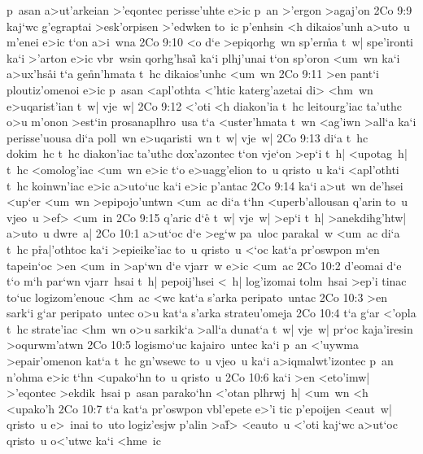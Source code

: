 p~asan
a>ut'arkeian
>'eqontec
perisse'uhte
e>ic
p~an
>'ergon
>agaj'on\bibvsend
\vs 2Co 9:9
kaj`wc
g'egraptai
>esk'orpisen
>'edwken
to~ic
p'enhsin
<h
dikaios'unh
a>uto~u
m'enei
e>ic
t`on
a>i~wna\bibvsend
\vs 2Co 9:10
<o
d`e
>epiqorhg~wn
sp'er\r{m}a
t~w|
spe'ironti
ka`i
>'arton
e>ic
vbr~wsin
qorhg'hsai\r{}
ka`i
plhj'unai
t`on
sp'oron
<um~wn
ka`i
a>ux'hs\r{a}i
t`a
ge\r{n}n'hmata
t~hc
dikaios'unhc
<um~wn\bibvsend
\vs 2Co 9:11
>en
pant`i
ploutiz'omenoi
e>ic
p~asan
<apl'othta
<'htic
katerg'azetai
di>
<hm~wn
e>uqarist'ian
t~w|
vje~w|\bibvsend
\vs 2Co 9:12
<'oti
<h
diakon'ia
t~hc
leitourg'iac
ta'uthc
o>u
m'onon
>est`in
prosanaplhro~usa
t`a
<uster'hmata
t~wn
<ag'iwn
>all`a
ka`i
perisse'uousa
di`a
poll~wn
e>uqaristi~wn
t~w|
vje~w|\bibvsend
\vs 2Co 9:13
di`a
t~hc
dokim~hc
t~hc
diakon'iac
ta'uthc
dox'azontec
t`on
vje`on
>ep`i
t~h|
<upotag~h|
t~hc
<omolog'iac
<um~wn
e>ic
t`o
e>uagg'elion
to~u
qristo~u
ka`i
<apl'othti
t~hc
koinwn'iac
e>ic
a>uto`uc
ka`i
e>ic
p'antac\bibvsend
\vs 2Co 9:14
ka`i
a>ut~wn
de'hsei
<up`er
<um~wn
>epipojo'untwn
<um~ac
di`a
t`hn
<uperb'allousan
q'arin
to~u
vjeo~u
>ef>
<um~in\bibvsend
\vs 2Co 9:15
q'aric
d`e\r{}
t~w|
vje~w|
>ep`i
t~h|
>anekdihg'htw|
a>uto~u
dwre~a|\bibvsend
\vs 2Co 10:1
a>ut`oc
d`e
>eg`w
pa~uloc
parakal~w
<um~ac
di`a
t~hc
p\r{r}a|\-'oth\-toc
ka`i
>epieike'iac
to~u
qristo~u
<`oc
kat`a
pr'oswpon
m`en
tapein`oc
>en
<um~in
>ap`wn
d`e
vjarr~w
e>ic
<um~ac\bibvsend
\vs 2Co 10:2
d'eomai
d`e
t`o
m`h
par`wn
vjarr~hsai
t~h|
pepoij'hsei
<~h|
log'izomai
tolm~hsai
>ep'i
tinac
to`uc
logizom'enouc
<hm~ac
<wc
kat`a
s'arka
peripato~untac\bibvsend
\vs 2Co 10:3
>en
sark`i
g`ar
peripato~untec
o>u
kat`a
s'arka
strateu'omeja\bibvsend
\vs 2Co 10:4
t`a
g`ar
<'opla
t~hc
strate'iac
<hm~wn
o>u
sarkik`a
>all`a
dunat`a
t~w|
vje~w|
pr`oc
kaja'iresin
>oqurwm'atwn\bibvsend
\vs 2Co 10:5
logismo`uc
kajairo~untec
ka`i
p~an
<'uywma
>epair'omenon
kat`a
t~hc
gn'wsewc
to~u
vjeo~u
ka`i
a>iqmalwt'izontec
p~an
n'ohma
e>ic
t`hn
<upako`hn
to~u
qristo~u\bibvsend
\vs 2Co 10:6
ka`i
>en
<eto'imw|
>'eqontec
>ekdik~hsai
p~asan
parako`hn
<'otan
plhrwj~h|
<um~wn
<h
<upako'h\bibvsend
\vs 2Co 10:7
t`a
kat`a
pr'oswpon
vbl'epete
e>'i
tic
p'epoijen
<eaut~w|
qristo~u
e>~inai
to~uto
logiz'esjw
p'alin
>a\r{f}>
<eauto~u
<'oti
kaj`wc
a>ut`oc
qristo~u
o<'utwc
ka`i
<hme~ic
